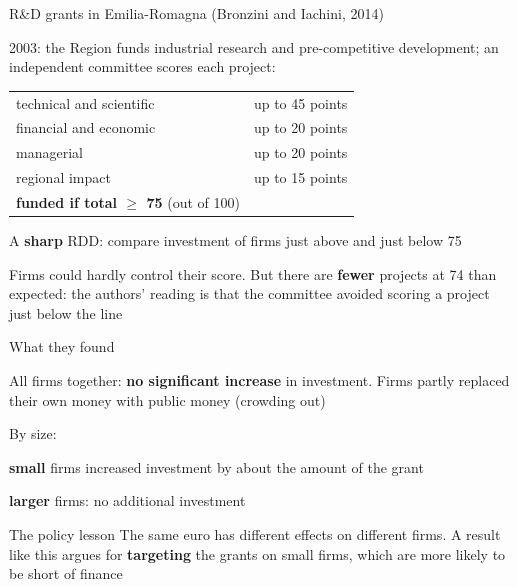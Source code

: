 \documentclass[aspectratio=169,xcolor=table]{beamer}
\begin{document}
\begin{frame}{R\&D grants in Emilia-Romagna (Bronzini and Iachini, 2014)}
\small
\bi
  \item 2003: the Region funds industrial research and pre-competitive development; an independent committee scores each project:
\ei
\centering\footnotesize
\begin{tabular}{lr}
\toprule
technical and scientific & up to 45 points \\
financial and economic & up to 20 points \\
managerial & up to 20 points \\
regional impact & up to 15 points \\
\midrule
\textbf{funded if total $\geq$ 75} (out of 100) & \\
\bottomrule
\end{tabular}
\vspace{0.1cm}

\raggedright\small
\bi
  \item A \textbf{sharp} RDD: compare investment of firms just above and just below 75
  \item Firms could hardly control their score. But there are \textbf{fewer} projects at 74 than expected: the authors' reading is that the committee avoided scoring a project just below the line
\ei
\end{frame}

\begin{frame}{What they found}
\small
\bi
  \item All firms together: \textbf{no significant increase} in investment. Firms partly replaced their own money with public money (crowding out)
  \item By size:
    \bi
      \item \textbf{small} firms increased investment by about the amount of the grant
      \item \textbf{larger} firms: no additional investment
    \ei
\ei
\begin{exampleblock}{The policy lesson}
The same euro has different effects on different firms. A result like this argues for \textbf{targeting} the grants on small firms, which are more likely to be short of finance
\end{exampleblock}
\end{frame}
\end{document}
